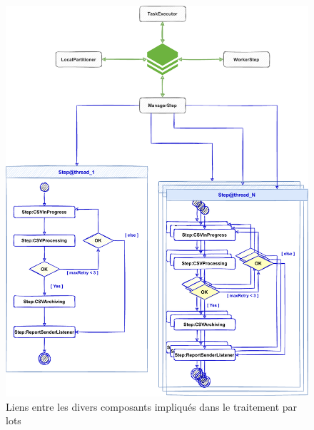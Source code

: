 \begin{figure}[!hbt]
    \begin{center}
        \includegraphics[width=\linewidth]{images/sec4/batchdiagram.pdf}
        \caption{Liens entre les divers composants impliqués dans le traitement par lots}
        \label{fig:batch}
    \end{center}
\end{figure}
